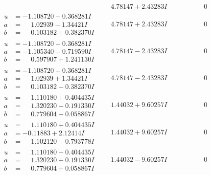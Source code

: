 \documentclass[1p]{elsarticle_modified}
\theoremstyle{definition}
\begin{document}
$$\begin{array}{c|c|c}
 & \phantom{-}4.78147 + 2.43283 I & \phantom{-0.000000 } 0 \\ \hline\begin{aligned}
u &= -1.108720 + 0.368281 I \\
a &= \phantom{-}1.02939 - 1.34421 I \\
b &= \phantom{-}0.103182 + 0.382370 I\end{aligned}
 & \phantom{-}4.78147 + 2.43283 I & \phantom{-0.000000 } 0 \\ \hline\begin{aligned}
u &= -1.108720 - 0.368281 I \\
a &= -1.105340 - 0.719590 I \\
b &= \phantom{-}0.597907 + 1.241130 I\end{aligned}
 & \phantom{-}4.78147 - 2.43283 I & \phantom{-0.000000 } 0 \\ \hline\begin{aligned}
u &= -1.108720 - 0.368281 I \\
a &= \phantom{-}1.02939 + 1.34421 I \\
b &= \phantom{-}0.103182 - 0.382370 I\end{aligned}
 & \phantom{-}4.78147 - 2.43283 I & \phantom{-0.000000 } 0 \\ \hline\begin{aligned}
u &= \phantom{-}1.110180 + 0.404435 I \\
a &= \phantom{-}1.320230 - 0.191330 I \\
b &= \phantom{-}0.779604 - 0.058867 I\end{aligned}
 & \phantom{-}1.44032 + 9.60257 I & \phantom{-0.000000 } 0 \\ \hline\begin{aligned}
u &= \phantom{-}1.110180 + 0.404435 I \\
a &= -0.11883 + 2.12414 I \\
b &= \phantom{-}1.102120 - 0.793778 I\end{aligned}
 & \phantom{-}1.44032 + 9.60257 I & \phantom{-0.000000 } 0 \\ \hline\begin{aligned}
u &= \phantom{-}1.110180 - 0.404435 I \\
a &= \phantom{-}1.320230 + 0.191330 I \\
b &= \phantom{-}0.779604 + 0.058867 I\end{aligned}
 & \phantom{-}1.44032 - 9.60257 I & \phantom{-0.000000 } 0 \\ \hline\begin{aligned}

\end{aligned}
\end{array}$$
\end{document}
